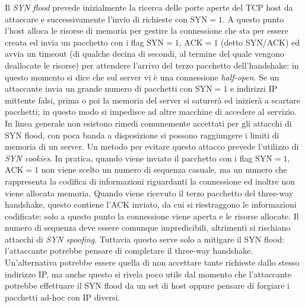 Il \textit{SYN flood} prevede inizialmente la ricerca delle porte aperte del TCP host da attaccare e successivamente l'invio di richieste con $\text{SYN}=1$. A questo punto l'host alloca le risorse di memoria per gestire la connessione che sta per essere creata ed invia un pacchetto con i flag $\text{SYN}=1$, $\text{ACK}=1$ (detto SYN/ACK) ed avvia un timeout (di qualche decina di secondi, al termine del quale vengono deallocate le risorse) per attendere l'arrivo del terzo pacchetto dell'handshake: in questo momento si dice che sul server vi è una connessione \textit{half-open}. Se un attaccante invia un grande numero di pacchetti con $\text{SYN}=1$ e indirizzi IP mittente falsi, prima o poi la memoria del server si saturerà ed inizierà a scartare pacchetti; in questo modo si impedisce ad altre macchine di accedere al servizio.\\
In linea generale non esistono rimedi comunemente accettati per gli attacchi di SYN flood, con poca banda a disposizione si possono raggiungere i limiti di memoria di un server. Un metodo per evitare questo attacco prevede l'utilizzo di \textit{SYN cookies}. In pratica, quando viene inviato il pacchetto con i flag $\text{SYN}=1$, $\text{ACK}=1$ non viene scelto un numero di sequenza casuale, ma un numero che rappresenta la codifica di informazioni riguardanti la connessione ed inoltre non viene allocata memoria. Quando viene ricevuto il terzo pacchetto del three-way handshake, questo contiene l'ACK inviato, da cui si riestraggono le informazioni codificate: solo a questo punto la connessione viene aperta e le risorse allocate. Il numero di sequenza deve essere comunque impredicibili, altrimenti si rischiano attacchi di \textit{SYN spoofing}. Tuttavia questo serve solo a mitigare il SYN flood: l'attaccante potrebbe pensare di completare il three-way handshake. Un'alternativa potrebbe essere quella di non accettare tante richieste dallo stesso indirizzo IP, ma anche questo si rivela poco utile dal momento che l'attaccante potrebbe effettuare il SYN flood da un set di host oppure pensare di forgiare i pacchetti ad-hoc con IP diversi.\\
